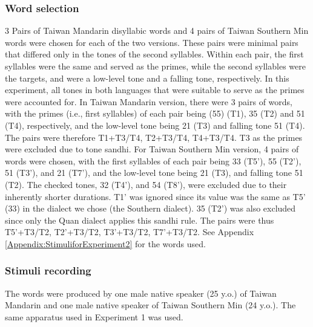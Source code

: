 \documentclass[12pt]{report}
\begin{document}
\begin{CJK}{UTF8}{bsmi}
\subsubsection{Word selection}
3 Pairs of Taiwan Mandarin disyllabic words and 4 pairs of Taiwan Southern Min words were chosen for each of the two versions. These pairs were minimal pairs that differed only in the tones of the second syllables. Within each pair, the first syllables were the same and served as the primes, while the second syllables were the targets, and were a low-level tone and a falling tone, respectively. In this experiment, all tones in both languages that were suitable to serve as the primes were accounted for. In Taiwan Mandarin version, there were 3 pairs of words, with the primes (i.e., first syllables) of each pair being (55) (T1), 35 (T2) and 51 (T4), respectively, and the low-level tone being 21 (T3) and falling tone 51 (T4). The pairs were therefore T1+T3/T4, T2+T3/T4, T4+T3/T4. T3 as the primes were excluded due to tone sandhi. For Taiwan Southern Min version, 4 pairs of words were chosen, with the first syllables of each pair being 33 (T5'), 55 (T2'), 51 (T3'), and 21 (T7'), and the low-level tone being 21 (T3), and falling tone 51 (T2). The checked tones, 32 (T4'), and 54 (T8'), were excluded due to their inherently shorter durations. T1' was ignored since its value was the same as T5' (33) in the dialect we chose (the Southern dialect). 35 (T2') was also excluded since only the Quan dialect applies this sandhi rule. The pairs were thus T5'+T3/T2, T2'+T3/T2, T3'+T3/T2, T7'+T3/T2. See Appendix \ref{Appendix:StimuliforExperiment2} for the words used.

\subsubsection{Stimuli recording}
The words were produced by one male native speaker (25 y.o.) of Taiwan Mandarin and one male native speaker of Taiwan Southern Min (24 y.o.). The same apparatus used in Experiment 1 was used.


\end{CJK}
\end{document}
